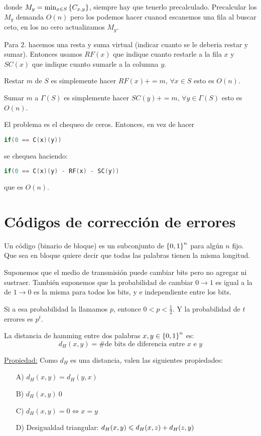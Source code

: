 \documentclass[12pt,a4paper]{article}
\begin{document}
donde $M_{y} = \min_{x\in S}\left\lbrace C_{x,y} \right\rbrace$, siempre hay que tenerlo precalculado. Precalcular 
los $M_{y}$ demanda $O(n)$ pero los podemos hacer cuanod escanemos una fila al buscar 
ceto, en los no cero actualizamos $M_{y}$.
\medskip

Para $2.$ hacemos una resta y suma virtual (indicar cuanto se le deberia restar y sumar). 
Entonces usamos $RF(x)$ que indique cuanto restarle a la fila $x$ y $SC(x)$ que indique 
cuanto sumarle a la columna $y$.
\medskip

Restar $m$ de $S$ es simplemente hacer $RF(x) += m,\, \forall x\in S$ esto es $O(n)$.

Sumar $m$ a $\Gamma(S)$ es simplemente hacer $SC(y) += m,\, \forall y\in \Gamma(S)$ esto es $O(n)$.
\medskip

El problema es el chequeo de ceros. Entonces, en vez de hacer
\begin{lstlisting}[language=C]
    if(0 == C(x)(y))
\end{lstlisting}

se chequea haciendo:
\begin{lstlisting}[language=C]
    if(0 == C(x)(y) - RF(x) - SC(y))
\end{lstlisting}
que es $O(n)$.

\section{Códigos de corrección de errores}
Un código (binario de bloque) es un subconjunto de $\left\lbrace 0,1 \right\rbrace^{n}$ para algún 
$n$ fijo. Que sea en bloque quiere decir que todas las palabras tienen la misma
longitud.
\medskip

Suponemos que el medio de transmisión puede cambiar bits pero no agregar ni sustraer.
También suponemos que la probabilidad de cambiar $0 \to 1$ es igual a la de $1 \to 0$ 
es la misma para todos los bits, y e independiente entre los bits.
\medskip

Si a esa probabilidad la llamamos $p$, entonce $0 < p < \frac{1}{2}$. Y la probabilidad 
de $t$ errores es $p^{t}$.

\begin{definition} La distancia de hamming entre dos palabras $x,y\in \left\lbrace 0,1 \right\rbrace^{n}$ es:
    $$d_{H}(x,y) = \# \text{de bits de diferencia entre $x$ e $y$}$$
\end{definition}

\underline{Propiedad:} Como $d_{H}$ es una distancia, valen las siguientes propiedades:
\begin{itemize}
    \item [A)] $d_{H}(x,y) = d_{H}(y,x)$
    \item [B)] $d_{H}(x,y) \> 0$
    \item [C)] $d_{H}(x,y) = 0 \iff x = y$
    \item [D)] Desigualdad triangular: $d_{H}(x,y) \leqslant d_{H}(x,z) + d_{H}(z,y)$
\end{itemize}
\end{document}
